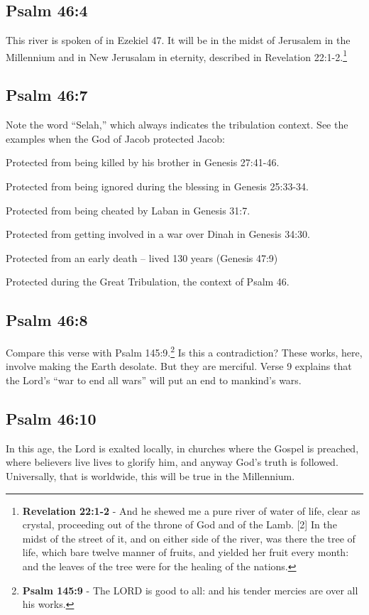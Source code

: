 \subsection{Psalm 46:4}
This river is spoken of in Ezekiel 47. It will be in the midst of Jerusalem in the Millennium and in New Jerusalam in eternity, described in Revelation 22:1-2.\footnote{\textbf{Revelation 22:1-2} - And he shewed me a pure river of water of life, clear as crystal, proceeding out of the throne of God and of the Lamb. [2] In the midst of the street of it, and on either side of the river, was there the tree of life, which bare twelve manner of fruits, and yielded her fruit every month: and the leaves of the tree were for the healing of the nations.}

\subsection{Psalm 46:7}
Note the word ``Selah,'' which always indicates the tribulation context.  See the examples when the God of Jacob  protected Jacob:
\begin{compactenum}
	\item Protected from being killed by his brother in Genesis 27:41-46.
	\item Protected from being ignored during the blessing in Genesis 25:33-34.
	\item Protected from being cheated by Laban in Genesis 31:7.
	\item Protected from getting involved in a war over Dinah in Genesis 34:30.
	\item Protected from an early death -- lived 130 years (Genesis 47:9)
	\item Protected during the Great Tribulation, the context of Psalm 46.\cite{Ruckman1992PsalmsV1}
\end{compactenum}

\subsection{Psalm 46:8}
Compare this verse with Psalm 145:9.\footnote{\textbf{Psalm 145:9} - The LORD is good to all: and his tender mercies are over all his works.} Is this a contradiction? These works, here, involve making the Earth desolate. But they are merciful. Verse  9 explains that the Lord's ``war to end all wars'' will put an end to mankind's wars.

\subsection{Psalm 46:10}
In this age, the Lord is exalted locally, in churches where the Gospel is preached, where believers live lives to glorify him, and anyway God's truth is followed. Universally, that is worldwide, this will be true in the Millennium.
